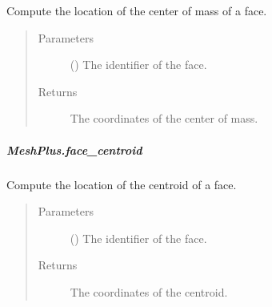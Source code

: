 \documentclass[letterpaper,10pt,english]{sphinxmanual}
\begin{document}
\begin{fulllineitems}
\begin{fulllineitems}
\label{\detokenize{api/generated/directional_clustering.mesh.MeshPlus.face_center:directional_clustering.mesh.MeshPlus.face_center}}
Compute the location of the center of mass of a face.
\begin{quote}\begin{description}
\item[{Parameters}] \leavevmode
{} () \textendash{} The identifier of the face.

\item[{Returns}] \leavevmode
{} \textendash{} The coordinates of the center of mass.

\end{description}\end{quote}

\end{fulllineitems}



\subparagraph{MeshPlus.face\_centroid}
\label{\detokenize{api/generated/directional_clustering.mesh.MeshPlus.face_centroid:meshplus-face-centroid}}\label{\detokenize{api/generated/directional_clustering.mesh.MeshPlus.face_centroid::doc}}

\begin{fulllineitems}
\label{\detokenize{api/generated/directional_clustering.mesh.MeshPlus.face_centroid:directional_clustering.mesh.MeshPlus.face_centroid}}
Compute the location of the centroid of a face.
\begin{quote}\begin{description}
\item[{Parameters}] \leavevmode
{} () \textendash{} The identifier of the face.

\item[{Returns}] \leavevmode
{} \textendash{} The coordinates of the centroid.

\end{description}\end{quote}


\end{fulllineitems}
\end{fulllineitems}
\end{document}
